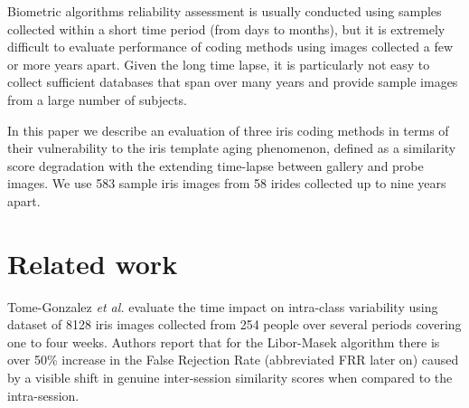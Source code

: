 \documentclass{article}
\begin{document}
Biometric algorithms reliability assessment is usually conducted using samples collected within a short time period (from days to months), but it is extremely difficult to evaluate performance of coding methods using images collected a few or more years apart. Given the long time lapse, it is particularly not easy to collect sufficient databases that span over many years and provide sample images from a large number of subjects.

In this paper we describe an evaluation of three iris coding methods in terms of their vulnerability to the iris template aging phenomenon, defined as a similarity score degradation with the extending time-lapse between gallery and probe images. We use 583 sample iris images from 58 irides collected up to nine years apart.

\section{Related work}
\label{sec:related}

Tome-Gonzalez \emph{et al.} \cite{gonzalez2008} evaluate the time impact on intra-class variability using dataset of 8128 iris images collected from 254 people over several periods covering one to four weeks. Authors report that for the Libor-Masek algorithm there is over 50\% increase in the False Rejection Rate (abbreviated FRR later on) caused by a visible shift in genuine inter-session similarity scores when compared to the intra-session.
\end{document}
